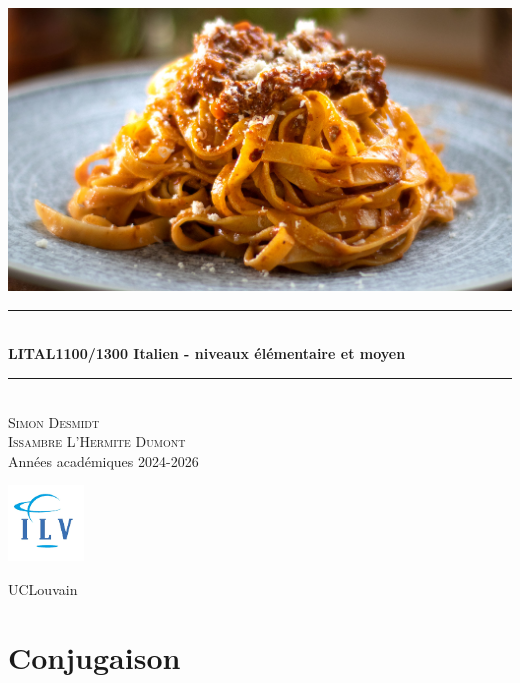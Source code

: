 \documentclass[12pt, openany]{report}
\newcommand{\HRule}{\rule{\linewidth}{0.5mm}}
\begin{document}
\begin{titlepage}
    \begin{sffamily}
    \begin{center}
        \includegraphics[scale=0.25]{img/page_de_garde.png} \\[1cm]
        \HRule \\[0.4cm]
        { \huge \bfseries LITAL1100/1300 Italien - niveaux élémentaire et moyen \\[0.4cm] }
    
        \HRule \\[1.5cm]
        \textsc{\LARGE Simon Desmidt\\ Issambre L'Hermite Dumont}\\[1cm]
        \vfill
        \vspace{2cm}
        {\large Années académiques 2024-2026}
        \vspace{0.4cm}
         
        \includegraphics[width=0.15\textwidth]{img/ilv.png}
        
        UCLouvain\\
    
    \end{center}
    \end{sffamily}
\end{titlepage}

\setcounter{tocdepth}{1}
\tableofcontents
\chapter{Conjugaison}
\end{document}

